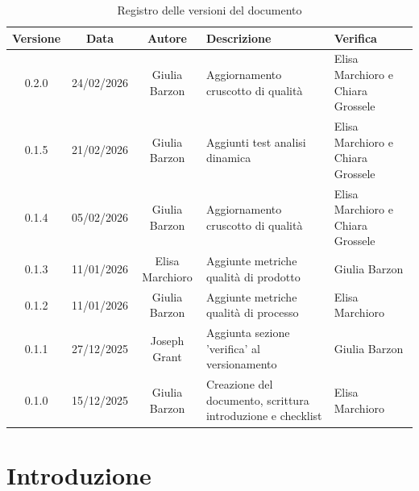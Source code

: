 \documentclass[11pt,a4paper]{article}
\begin{document}
\begin{table}[H]
    \centering
    \begin{tabular}{|c|c|c|>{\raggedright\arraybackslash}p{}|p{}|}
        \hline
        \textbf{Versione} & \textbf{Data} & \textbf{Autore} & \textbf{Descrizione} & \textbf{Verifica} \\
        \hline
        0.2.0 & 24/02/2026 & Giulia Barzon & Aggiornamento cruscotto di qualità & Elisa Marchioro e Chiara Grossele\\
        \hline
        0.1.5 & 21/02/2026 & Giulia Barzon & Aggiunti test analisi dinamica & Elisa Marchioro e Chiara Grossele\\
        \hline
        0.1.4 & 05/02/2026 & Giulia Barzon & Aggiornamento cruscotto di qualità & Elisa Marchioro e Chiara Grossele\\
        \hline
        0.1.3 & 11/01/2026 & Elisa Marchioro & Aggiunte metriche qualità di prodotto & Giulia Barzon \\
        \hline
        0.1.2 & 11/01/2026 & Giulia Barzon & Aggiunte metriche qualità di processo & Elisa Marchioro\\
        \hline
        0.1.1 & 27/12/2025 & Joseph Grant & Aggiunta sezione 'verifica' al versionamento & Giulia Barzon\\
        \hline
        0.1.0 & 15/12/2025 & Giulia Barzon & Creazione del documento, scrittura introduzione e checklist & Elisa Marchioro\\
        \hline
    \end{tabular}
    \caption{Registro delle versioni del documento}
    \label{tab:versionamento}
\end{table}

\newpage

\tableofcontents
\thispagestyle{empty}
\newpage

\setcounter{page}{1}

\section{Introduzione}
\end{document}
